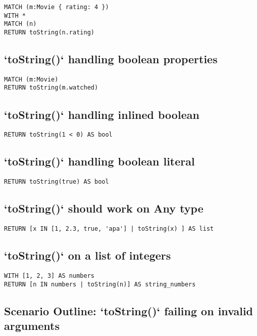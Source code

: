 \begin{lstlisting}
MATCH (m:Movie { rating: 4 })
WITH *
MATCH (n)
RETURN toString(n.rating)
\end{lstlisting}

\subsection{`toString()` handling boolean properties}

\begin{lstlisting}
MATCH (m:Movie)
RETURN toString(m.watched)
\end{lstlisting}

\subsection{`toString()` handling inlined boolean}

\begin{lstlisting}
RETURN toString(1 < 0) AS bool
\end{lstlisting}

\subsection{`toString()` handling boolean literal}

\begin{lstlisting}
RETURN toString(true) AS bool
\end{lstlisting}

\subsection{`toString()` should work on Any type}

\begin{lstlisting}
RETURN [x IN [1, 2.3, true, 'apa'] | toString(x) ] AS list
\end{lstlisting}

\subsection{`toString()` on a list of integers}

\begin{lstlisting}
WITH [1, 2, 3] AS numbers
RETURN [n IN numbers | toString(n)] AS string_numbers
\end{lstlisting}

\subsection{Scenario Outline: `toString()` failing on invalid arguments}

